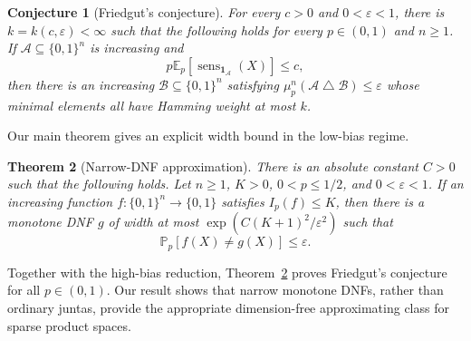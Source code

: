 \documentclass[11pt,letterpaper]{article}
\newtheorem{theorem}{Theorem}[section]
\newtheorem{conjecture}[theorem]{Conjecture}
\theoremstyle{definition}
\theoremstyle{remark}
\newcommand{\bits}{\{0,1\}}
\newcommand{\E}{\mathbb E}
\renewcommand{\Pr}{\mathbb P}
\newcommand{\one}{\mathbf 1}
\newcommand{\sens}{\operatorname{sens}}
\newcommand{\cA}{\mathcal A}
\newcommand{\cB}{\mathcal B}
\begin{document}
\begin{conjecture}[Friedgut's conjecture]
\label{conj:friedgut}
For every $c>0$ and $0<\varepsilon<1$, there is
$k=k(c,\varepsilon)<\infty$ such that the following holds for every
$p\in(0,1)$ and $n\ge1$.  If $\cA\subseteq\bits^n$ is increasing and
\[
       p\E_p[\sens_{\one_{\cA}}(X)]\le c,
\]
then there is an increasing $\cB\subseteq\bits^n$ satisfying
$\mu_p^n(\cA\mathbin\triangle\cB)\le\varepsilon$ whose minimal elements all
have Hamming weight at most $k$.
\end{conjecture}

Our main theorem gives an explicit width bound in the low-bias regime.

\begin{theorem}[Narrow-DNF approximation]
\label{thm:main}
There is an absolute constant $C>0$ such that the following holds.  Let
$n\ge1$, $K>0$, $0<p\le1/2$, and $0<\varepsilon<1$.  If an increasing
function $f:\bits^n\to\bits$ satisfies $I_p(f)\le K$, then there is a
monotone DNF $g$ of width at most
$\exp\!\left(C(K+1)^2/\varepsilon^2\right)$ such that
\[
       \Pr_p[f(X)\ne g(X)]\le\varepsilon.
\]
\end{theorem}

Together with the high-bias reduction, Theorem~\ref{thm:main} proves
Friedgut's conjecture \cite[Conjecture~1.5]{Friedgut1999} for all $p\in(0,1)$.
Our result shows that narrow monotone DNFs,
rather than ordinary juntas, provide the appropriate dimension-free
approximating class for sparse product spaces.
\end{document}
